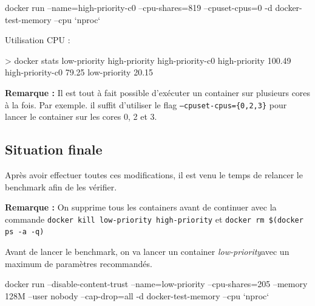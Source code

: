 \documentclass[11pt,a4paper,oneside]{report}
\newcommand{\code}[1]{\texttt{#1}}
\begin{document}
\begin{textcode}
docker run --name=high-priority-c0 --cpu-shares=819 --cpuset-cpus=0 -d docker-test-memory --cpu `nproc`
\end{textcode}

Utilisation CPU :
\begin{textcode}
> docker stats low-priority high-priority high-priority-c0
high-priority       100.49%
high-priority-c0    79.25%
low-priority        20.15%
\end{textcode}

\textbf{Remarque :} Il est tout à fait possible d'exécuter un container sur plusieurs cores à la fois. Par exemple. il suffit d'utiliser le flag \code{--cpuset-cpus=\{0,2,3\}} pour lancer le container sur les cores 0, 2 et 3.


\subsection{Situation finale}
Après avoir effectuer toutes ces modifications, il est venu le temps de relancer le benchmark afin de les vérifier.

\textbf{Remarque :} On supprime tous les containers avant de continuer avec la commande \code{docker kill low-priority high-priority} et \code{docker rm \$(docker ps -a -q)}

Avant de lancer le benchmark, on va lancer un container \textit{low-priority}avec un maximum de paramètres recommandés.

\begin{textcode}
docker run --disable-content-trust --name=low-priority --cpu-shares=205 --memory 128M --user nobody --cap-drop=all -d docker-test-memory --cpu `nproc`
\end{textcode}
\end{document}
